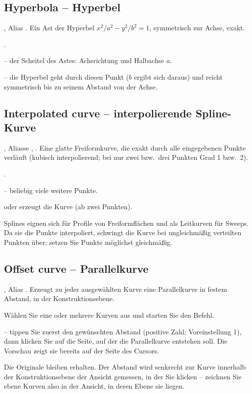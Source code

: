 \subsection{Hyperbola -- Hyperbel}\label{sec:cmd-hyperbola}
, Alias . Ein Ast der Hyperbel $x^2/a^2 - y^2/b^2 = 1$, symmetrisch zur
Achse, exakt.
\begin{schritte}
\item {}.
\item {} -- der Scheitel des Astes: Achsrichtung und Halbachse $a$.
\item {} -- die
  Hyperbel geht durch diesen Punkt ($b$ ergibt sich daraus) und reicht symmetrisch bis zu
  seinem Abstand von der Achse.
\end{schritte}

\subsection{Interpolated curve -- interpolierende Spline-Kurve}\label{sec:cmd-spline}
, Aliasse , . Eine glatte Freiformkurve, die exakt durch alle eingegebenen
Punkte verläuft (kubisch interpolierend; bei nur zwei bzw.\ drei Punkten Grad 1 bzw.\ 2).
\begin{schritte}
\item {}.
\item {} -- beliebig viele weitere Punkte.
\item {} oder  erzeugt die Kurve (ab zwei Punkten).
\end{schritte}
Splines eignen sich für Profile von Freiformflächen und als Leitkurven für Sweeps. Da sie die
Punkte interpoliert, schwingt die Kurve bei ungleichmäßig verteilten Punkten über; setzen Sie
Punkte möglichst gleichmäßig.

\subsection{Offset curve -- Parallelkurve}\label{sec:cmd-offset-curve}
, Alias . Erzeugt zu jeder ausgewählten Kurve eine
Parallelkurve in festem Abstand, in der Konstruktionsebene.
\begin{schritte}
\item Wählen Sie eine oder mehrere Kurven aus und starten Sie den Befehl.
\item {}
  -- tippen Sie zuerst den gewünschten Abstand (positive Zahl; Voreinstellung 1), dann klicken
  Sie auf die Seite, auf der die Parallelkurve entstehen soll. Die Vorschau zeigt sie bereits
  auf der Seite des Cursors.
\end{schritte}
Die Originale bleiben erhalten. Der Abstand wird senkrecht zur Kurve innerhalb der
Konstruktionsebene der Ansicht gemessen, in der Sie klicken -- zeichnen Sie ebene Kurven also
in der Ansicht, in deren Ebene sie liegen.

